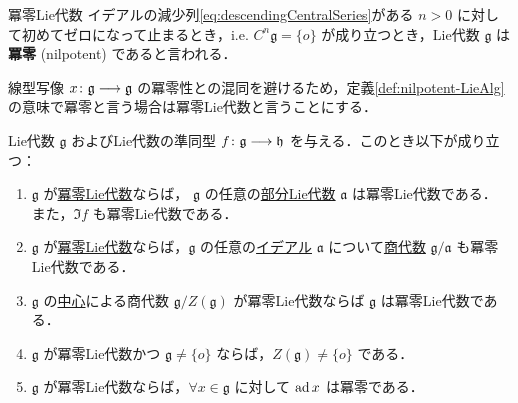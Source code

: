 \documentclass[rep_main]{subfiles}
\begin{document}
\begin{mydef}[label=def:nilpotent-LieAlg]{冪零Lie代数}
    イデアルの減少列\eqref{eq:descendingCentralSeries}がある $n > 0$ に対して初めてゼロになって止まるとき，i.e. $C^n \mathfrak{g} = \{o\}$ が成り立つとき，Lie代数 $\mathfrak{g}$ は\textbf{冪零} (nilpotent) であると言われる．
\end{mydef}

\begin{marker}
    線型写像 $x \colon \mathfrak{g} \longrightarrow \mathfrak{g}$ の冪零性との混同を避けるため，定義\ref{def:nilpotent-LieAlg}の意味で冪零と言う場合は冪零Lie代数と言うことにする．
\end{marker}

\begin{myprop}[label=prop:nilpo-basic]{}
    Lie代数 $\mathfrak{g}$ およびLie代数の準同型 $f \colon \mathfrak{g} \longrightarrow \mathfrak{h}$ を与える．このとき以下が成り立つ：
    \begin{enumerate}
        \item $\mathfrak{g}$ が\hyperref[def:nilpotent-LieAlg]{冪零Lie代数}ならば，
        $\mathfrak{g}$ の任意の\hyperref[def:subLieAlg]{部分Lie代数} $\mathfrak{a}$ は冪零Lie代数である．
        また，$\Im f$ も冪零Lie代数である．
        \item $\mathfrak{g}$ が\hyperref[def:nilpotent-LieAlg]{冪零Lie代数}ならば，$\mathfrak{g}$ の任意の\hyperref[def:ideal-LieAlg]{イデアル} $\mathfrak{a}$ について\hyperref[def:quotient-LieAlg]{商代数} $\mathfrak{g} / \mathfrak{a}$ も冪零Lie代数である．
        \item $\mathfrak{g}$ の\hyperref[def:center-LieAlg]{中心}による商代数 $\mathfrak{g} / Z (\mathfrak{g})$ が冪零Lie代数ならば $\mathfrak{g}$ は冪零Lie代数である．
        \item $\mathfrak{g}$ が冪零Lie代数かつ $\mathfrak{g} \neq \{o\}$ ならば，$Z (\mathfrak{g}) \neq \{o\}$ である．
        \item $\mathfrak{g}$ が冪零Lie代数ならば，$\forall x \in \mathfrak{g}$ に対して $\operatorname{ad} x$ は冪零である．
    \end{enumerate}
\end{myprop}
\end{document}
